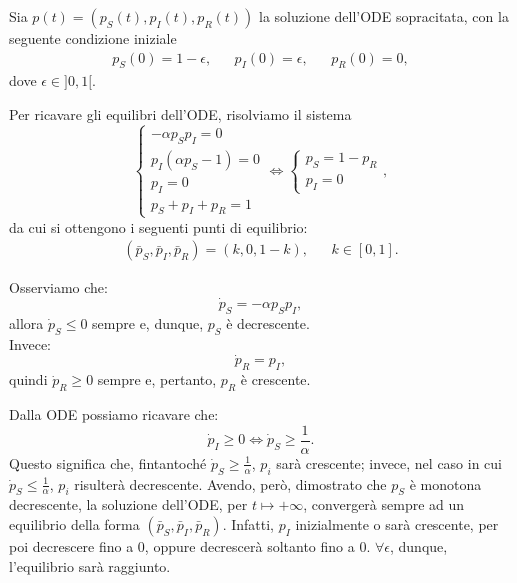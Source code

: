 \documentclass[11pt,largemargins]{homework}
\begin{document}
 Sia $p\left(t\right)=\left(p_{S}\left(t\right),p_{I}\left(t\right),p_{R}\left(t\right)\right)$ la soluzione dell'ODE sopracitata, con la seguente condizione iniziale
 \begin{align*}
 p_{S}\left(0\right)=1-\epsilon, && p_{I}\left(0\right)=\epsilon,&&p_{R}\left(0\right)=0,
 \end{align*}
 dove $\epsilon \in ]0,1[$.
 \begin {alphaparts}
 \questionpart
 
  Per ricavare gli equilibri dell'ODE, risolviamo il sistema
  \begin{equation*}
\begin {cases} -\alpha p_{S}p_{I}=0\\p_{I}\left(\alpha p_{S}-1\right)=0\\p_{I}=0\\p_{S}+p_{I}+p_{R}=1\end{cases}\Leftrightarrow\begin {cases} p_{S}=1-p_{R}\\p_{I}=0\end{cases},
\end{equation*}
    da cui si ottengono i seguenti punti di equilibrio:
    \begin{align*}
    \left(\bar{p}_{S},\bar{p}_{I},\bar{p}_{R}\right)=\left(k,0,1-k\right), &&k\in[0,1].
    \end{align*}
  
 \questionpart
 Osserviamo che:
 \begin{equation*}
 \dot{p}_{S}=-\alpha p_{S}p_{I},
 \end{equation*}
  allora $\dot{p}_{S}\leq 0$ sempre e, dunque, $p_{S}$ è decrescente.\\
  Invece:
  \begin{equation*}
 \dot{p}_{R}=p_{I},
 \end{equation*}  
  quindi $\dot{p}_{R}\geq 0$ sempre e, pertanto, $p_{R}$ è crescente.
  
\questionpart
Dalla ODE possiamo ricavare che:
\begin{equation*}
\dot{p}_{I}\geq 0\Leftrightarrow \dot{p}_{S}\geq \frac{1}{\alpha}.
\end{equation*}  
Questo significa che, fintantoché $\dot{p}_{S}\geq \frac{1}{\alpha}$, $p_{i}$ sarà crescente; invece, nel caso in cui $\dot{p}_{S}\leq \frac{1}{\alpha}$, $p_{i}$ risulterà decrescente.
Avendo, però, dimostrato che $p_{S}$ è monotona decrescente, la soluzione dell'ODE, per $t \mapsto +\infty$, convergerà sempre ad un equilibrio della forma  $\left(\bar{p}_{S},\bar{p}_{I},\bar{p}_{R}\right)$.
Infatti, $p_{I}$ inizialmente o sarà crescente, per poi decrescere fino a $0$, oppure decrescerà soltanto fino a $0$. $\forall \epsilon$, dunque, l'equilibrio sarà raggiunto.


\end{alphaparts}
\end{document}
